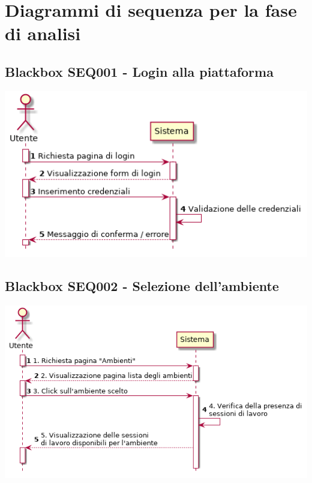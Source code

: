 \documentclass[../main.tex]{subfiles}
\begin{document}
\chapter{Diagrammi di sequenza per la fase di analisi}

\section{Blackbox SEQ001 - Login alla piattaforma }
\figure[H]
\centering
\includegraphics[width=14cm]{capitoli/usecases_diagrams/diagrams/SEQ001.png}
\endfigure

\section{Blackbox SEQ002 - Selezione dell'ambiente }
\figure[H]
\centering
\includegraphics[width=16cm]{capitoli/usecases_diagrams/diagrams/SEQ002.png}
\endfigure
\end{document}
